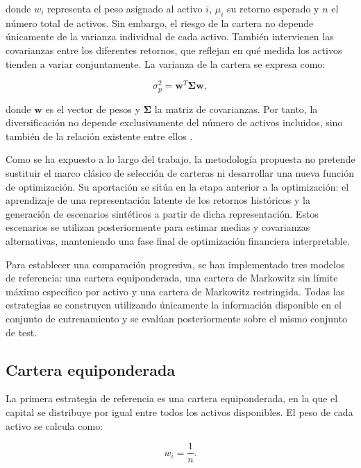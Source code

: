 donde \(w_i\) representa el peso asignado al activo \(i\), \(\mu_i\) su retorno esperado y \(n\) el número total de activos. Sin embargo, el riesgo de la cartera no depende únicamente de la varianza individual de cada activo. También intervienen las covarianzas entre los diferentes retornos, que reflejan en qué medida los activos tienden a variar conjuntamente. La varianza de la cartera se expresa como:

\begin{equation}
\sigma_p^2 = \mathbf{w}^{T}\boldsymbol{\Sigma}\mathbf{w},
\end{equation}

donde \(\mathbf{w}\) es el vector de pesos y \(\boldsymbol{\Sigma}\) la matriz de covarianzas. Por tanto, la diversificación no depende exclusivamente del número de activos incluidos, sino también de la relación existente entre ellos \cite{markowitz1952}.

Como se ha expuesto a lo largo del trabajo, la metodología propuesta no pretende sustituir el marco clásico de selección de carteras ni desarrollar una nueva función de optimización. Su aportación se sitúa en la etapa anterior a la optimización: el aprendizaje de una representación latente de los retornos históricos y la generación de escenarios sintéticos a partir de dicha representación. Estos escenarios se utilizan posteriormente para estimar medias y covarianzas alternativas, manteniendo una fase final de optimización financiera interpretable.

Para establecer una comparación progresiva, se han implementado tres modelos de referencia: una cartera equiponderada, una cartera de Markowitz sin límite máximo específico por activo y una cartera de Markowitz restringida. Todas las estrategias se construyen utilizando únicamente la información disponible en el conjunto de entrenamiento y se evalúan posteriormente sobre el mismo conjunto de test.

\subsection{Cartera equiponderada}

La primera estrategia de referencia es una cartera equiponderada, en la que el capital se distribuye por igual entre todos los activos disponibles. El peso de cada activo se calcula como:

\begin{equation}
w_i = \frac{1}{n}.
\end{equation}

